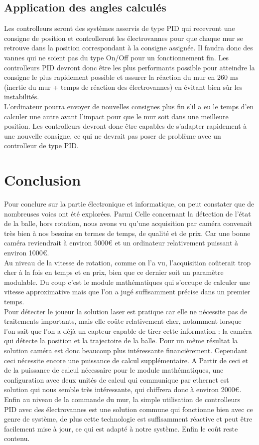 \section{Application des angles calculés}

Les controlleurs seront des systèmes asservis de type PID qui recevront une consigne de position et controlleront les électrovannes pour que chaque mur se retrouve dans la position correspondant à la consigne assignée. Il faudra donc des vannes qui ne soient pas du type On/Off pour un fonctionnement fin. Les controlleurs PID devront donc être les plus performants possible pour atteindre la consigne le plus rapidement possible et assurer la réaction du mur en 260 ms (inertie du mur + temps de réaction des électrovannes) en évitant bien sûr les instabilités.\\
L'ordinateur pourra envoyer de nouvelles consignes plus fin s'il a eu le temps d'en calculer une autre avant l'impact pour que le mur soit dans une meilleure position. Les controlleurs devront donc être capables de s'adapter rapidement à une nouvelle consigne, ce qui ne devrait pas poser de problème avec un controlleur de type PID.


\chapter{Conclusion}

Pour conclure sur la partie électronique et informatique, on peut constater que de nombreuses voies ont été explorées. Parmi Celle concernant la détection de l'état de la balle, hors rotation, nous avons vu qu'une acquisition par caméra convenait très bien à nos besoins en termes de temps, de qualité et de prix. Car une bonne caméra reviendrait à environ 5000€ et un ordinateur relativement puissant à environ 1000€.\\
Au niveau de la vitesse de rotation, comme on l'a vu, l'acquisition coûterait trop cher à la fois en temps et en prix, bien que ce dernier soit un paramètre modulable. Du coup c'est le module mathématiques qui s'occupe de calculer une vitesse approximative mais que l'on a jugé suffisamment précise dans un premier temps.\\
Pour détecter le joueur la solution laser est pratique car elle ne nécessite pas de traitements importants, mais elle coûte relativement cher, notamment lorsque l'on sait que l'on a déjà un capteur capable de tirer cette information : la caméra qui détecte la position et la trajectoire de la balle. Pour un même résultat la solution caméra est donc beaucoup plus intéressante financièrement. Cependant ceci nécessite encore une puissance de calcul supplémentaire. A Partir de ceci et de la puissance de calcul nécessaire pour le module mathématiques, une configuration avec deux unités de calcul qui communique par ethernet est solution qui nous semble très intéressante, qui chiffrera donc à environ 2000€.\\
Enfin au niveau de la commande du mur, la simple utilisation de controlleurs PID avec des électrovannes est une solution commune qui fonctionne bien avec ce genre de système, de plus cette technologie est suffisamment réactive et peut être facilement mise à jour, ce qui est adapté à notre système. Enfin le coût reste contenu.\\

